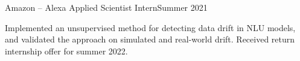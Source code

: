   {Amazon -- Alexa Applied Scientist Intern}{Summer 2021}

\vspace{0.15em}

Implemented an unsupervised method for detecting data drift in NLU models, and
validated the approach on simulated and real-world drift. Received return internship offer for summer 2022.
